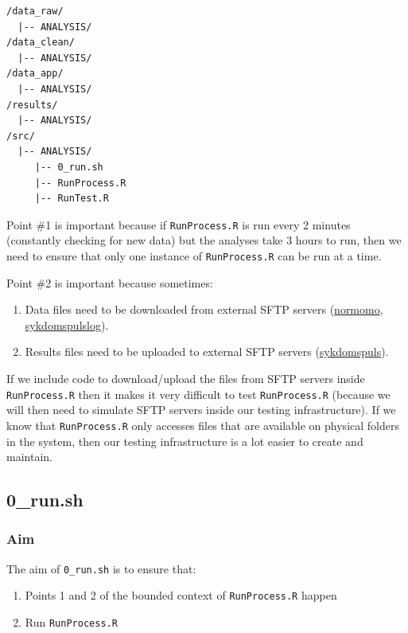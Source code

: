 \documentclass[12pt,]{article}
\providecommand{\tightlist}{%
  \setlength{\itemsep}{0pt}\setlength{\parskip}{0pt}}
\begin{document}
\begin{verbatim}
/data_raw/
  |-- ANALYSIS/
/data_clean/
  |-- ANALYSIS/
/data_app/
  |-- ANALYSIS/
/results/
  |-- ANALYSIS/
/src/
  |-- ANALYSIS/
     |-- 0_run.sh
     |-- RunProcess.R
     |-- RunTest.R
\end{verbatim}

Point \#1 is important because if \texttt{RunProcess.R} is run every 2
minutes (constantly checking for new data) but the analyses take 3 hours
to run, then we need to ensure that only one instance of
\texttt{RunProcess.R} can be run at a time.

Point \#2 is important because sometimes:

\begin{enumerate}
\def\labelenumi{\arabic{enumi}.}
\tightlist
\item
  Data files need to be downloaded from external SFTP servers
  (\href{https://folkehelseinstituttet.github.io/dashboards_normomo/}{normomo},
  \href{https://folkehelseinstituttet.github.io/dashboards_sykdomspuls_log/}{sykdomspulslog}).
\item
  Results files need to be uploaded to external SFTP servers
  (\href{https://folkehelseinstituttet.github.io/dashboards_sykdomspuls/}{sykdomspuls}).
\end{enumerate}

If we include code to download/upload the files from SFTP servers inside
\texttt{RunProcess.R} then it makes it very difficult to test
\texttt{RunProcess.R} (because we will then need to simulate SFTP
servers inside our testing infrastructure). If we know that
\texttt{RunProcess.R} only accesses files that are available on physical
folders in the system, then our testing infrastructure is a lot easier
to create and maintain.

\subsection{0\_run.sh}\label{run.sh}

\subsubsection{Aim}\label{aim-1}

The aim of \texttt{0\_run.sh} is to ensure that:

\begin{enumerate}
\def\labelenumi{\arabic{enumi}.}
\tightlist
\item
  Points 1 and 2 of the bounded context of \texttt{RunProcess.R} happen
\item
  Run \texttt{RunProcess.R}
\end{enumerate}
\end{document}
